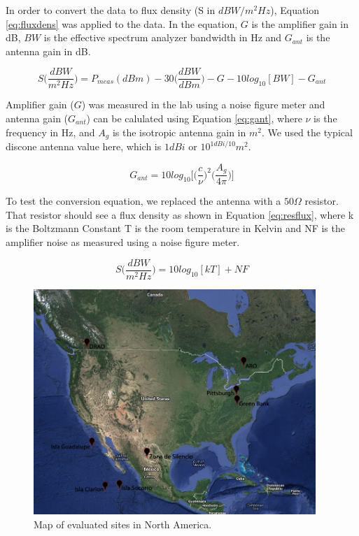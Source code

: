 In order to convert the data to flux density (S in $dBW/m^2Hz$), Equation \ref{eq:fluxdens} was applied to the data. In the equation, $G$ is the amplifier gain in dB, $BW$ is the effective spectrum analyzer bandwidth in Hz and $G_{ant}$ is the antenna gain in dB. 

\begin{equation}\label{eq:fluxdens}
S \Bigg( \frac{dBW}{m^2 Hz} \Bigg) = P_{meas} (dBm) - 30 \Bigg( \frac{dBW}{dBm} \Bigg) - G - 10log_{10} [BW] - G_{ant}
\end{equation}

Amplifier gain ($G$) was measured in the lab using a noise figure meter and antenna gain ($G_{ant}$) can be calulated using Equation \ref{eq:gant}, where $\nu$ is the frequency in Hz, and $A_g$ is the isotropic antenna gain in $m^2$. We used the typical discone antenna value here, which is $1 dBi$ or $10^{1dBi/10} m^2$. 

\begin{equation}\label{eq:gant}
G_{ant}= 10 log_{10} \Bigg[ \Bigg(\frac{c}{\nu} \Bigg)^2 \Bigg( \frac{A_g}{4 \pi} \Bigg) \Bigg]
\end{equation}

To test the conversion equation, we replaced the antenna with a $50 \Omega$ resistor. That resistor should see a flux density as shown in Equation \ref{eq:resflux}, where k is the Boltzmann Constant T is the room temperature in Kelvin and NF is the amplifier noise as measured using a noise figure meter. 

\begin{equation}\label{eq:resflux}
S \Bigg( \frac{dBW}{m^2 Hz} \Bigg) = 10 log_{10} [k T] + NF 
\end{equation}

\begin{figure}[tb]
\begin{center}
\includegraphics[width=0.95\textwidth]{RFI_testing/figures/large_scale_site_map.jpg}
\caption{Map of evaluated sites in North America.}
\label{Fig:site_map}
\end{center}
\end{figure}

